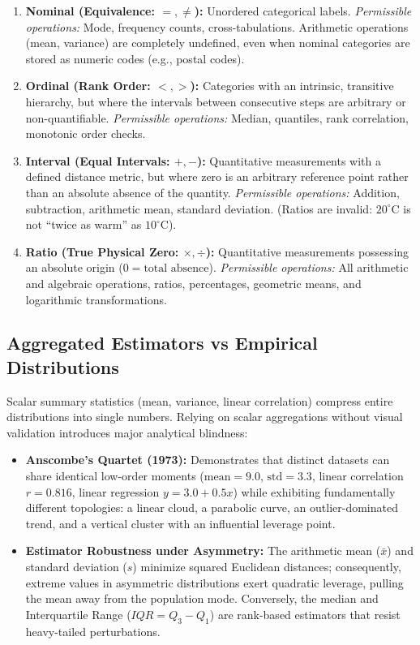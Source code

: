\documentclass[11pt,a4paper]{article}
\begin{document}
\begin{definitionbox}
\begin{enumerate}[leftmargin=*]
    \item \textbf{Nominal (Equivalence: $=, \neq$):} Unordered categorical labels. 
    \textit{Permissible operations:} Mode, frequency counts, cross-tabulations. Arithmetic operations (mean, variance) are completely undefined, even when nominal categories are stored as numeric codes (e.g., postal codes).
    \item \textbf{Ordinal (Rank Order: $<, >$):} Categories with an intrinsic, transitive hierarchy, but where the intervals between consecutive steps are arbitrary or non-quantifiable.
    \textit{Permissible operations:} Median, quantiles, rank correlation, monotonic order checks.
    \item \textbf{Interval (Equal Intervals: $+,-$):} Quantitative measurements with a defined distance metric, but where zero is an arbitrary reference point rather than an absolute absence of the quantity.
    \textit{Permissible operations:} Addition, subtraction, arithmetic mean, standard deviation. (Ratios are invalid: $20^\circ\text{C}$ is not ``twice as warm'' as $10^\circ\text{C}$).
    \item \textbf{Ratio (True Physical Zero: $\times, \div$):} Quantitative measurements possessing an absolute origin ($0 = \text{total absence}$).
    \textit{Permissible operations:} All arithmetic and algebraic operations, ratios, percentages, geometric means, and logarithmic transformations.
\end{enumerate}
\end{definitionbox}

\subsection*{Aggregated Estimators vs Empirical Distributions}
Scalar summary statistics (mean, variance, linear correlation) compress entire distributions into single numbers. Relying on scalar aggregations without visual validation introduces major analytical blindness:
\begin{itemize}[leftmargin=*]
    \item \textbf{Anscombe's Quartet (1973):} Demonstrates that distinct datasets can share identical low-order moments ($\text{mean} = 9.0$, $\text{std} = 3.3$, linear correlation $r = 0.816$, linear regression $y = 3.0 + 0.5x$) while exhibiting fundamentally different topologies: a linear cloud, a parabolic curve, an outlier-dominated trend, and a vertical cluster with an influential leverage point.
    \item \textbf{Estimator Robustness under Asymmetry:} The arithmetic mean ($\bar{x}$) and standard deviation ($s$) minimize squared Euclidean distances; consequently, extreme values in asymmetric distributions exert quadratic leverage, pulling the mean away from the population mode. Conversely, the median and Interquartile Range ($IQR = Q_3 - Q_1$) are rank-based estimators that resist heavy-tailed perturbations.
\end{itemize}
\end{document}
